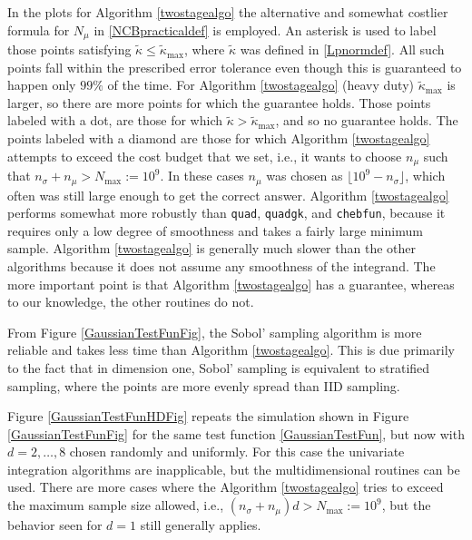 \documentclass[graybox]{svmult}
\newcommand{\tkappa}{\tilde{\kappa}}
\begin{document}
In the plots for Algorithm \ref{twostagealgo} the alternative and somewhat costlier formula for $N_{\mu}$ in \eqref{NCBpracticaldef} is employed. An asterisk is used to label those points satisfying $\tkappa \le \tkappa_{\max}$, where $\tkappa$ was defined in \eqref{Lpnormdef}. All such points fall within the prescribed error tolerance even though this is guaranteed to happen only $99\%$ of the time.  For Algorithm \ref{twostagealgo} (heavy duty) $\tkappa_{\max}$ is larger, so there are more points for which the guarantee holds.  Those points labeled with a dot, are those for which $\tkappa > \tkappa_{\max}$, and so no guarantee holds. The points labeled with a diamond are those for which Algorithm \ref{twostagealgo} attempts to exceed the cost budget that we set, i.e., it wants to choose $n_\mu$ such that $n_{\sigma}+n_\mu > N_{\max}:=10^9$. In these cases $n_\mu$ was chosen as $\lfloor 10^9 - n_\sigma \rfloor$, which often was still large enough to get the correct answer.  Algorithm \ref{twostagealgo} performs somewhat more robustly than {\tt quad}, {\tt quadgk}, and {\tt chebfun}, because it requires only a low degree of smoothness and takes a fairly large minimum sample. Algorithm \ref{twostagealgo} is generally much slower than the other algorithms because it does not assume any smoothness of the integrand. The more important point is that Algorithm \ref{twostagealgo} has a guarantee, whereas to our knowledge, the other routines do not.

From Figure \ref{GaussianTestFunFig}, the Sobol' sampling algorithm is more reliable and takes less time than Algorithm \ref{twostagealgo}.  This is due primarily to the fact that in dimension one, Sobol' sampling is equivalent to stratified sampling, where the points are more evenly spread than IID sampling.

Figure \ref{GaussianTestFunHDFig} repeats the simulation shown in Figure \ref{GaussianTestFunFig} for the same test function \eqref{GaussianTestFun}, but now with $d=2, \ldots, 8$ chosen randomly and uniformly.  For this case the univariate integration algorithms are inapplicable, but the multidimensional routines can be used.  There are more cases where the Algorithm \ref{twostagealgo} tries to exceed the maximum sample size allowed, i.e., $(n_{\sigma}+n_\mu)d > N_{\max}:=10^9$, but the behavior seen for $d=1$ still generally applies.  
\end{document}
